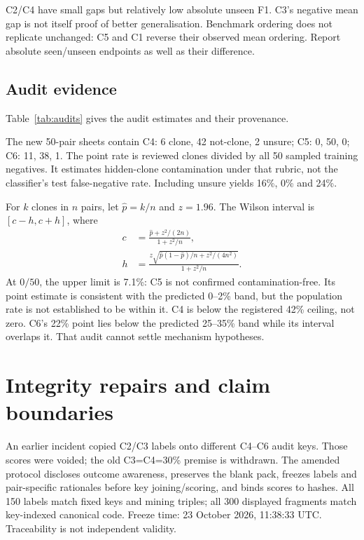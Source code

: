 \documentclass[conference]{IEEEtran}
\begin{document}
C2/C4 have small gaps but relatively low absolute unseen F1. C3's negative
mean gap is not itself proof of better generalisation. Benchmark ordering does
not replicate unchanged: C5 and C1 reverse their observed mean ordering.
Report absolute seen/unseen endpoints as well as their difference.

\subsection{Audit evidence}
Table~\ref{tab:audits} gives the audit estimates and their provenance.
\begin{table}[t]
\caption{All labels are agent/AI review, not independently human-validated.
C1 is an estimate, C2/C3 historical reviews, and C4--C6 use amendment
P4-AI-AUDIT-2026-10-23. Incl.\ unsure treats uncertain cases as clones.}
\label{tab:audits}
\centering\footnotesize
\setlength{\tabcolsep}{3pt}

\end{table}
The new 50-pair sheets contain C4: 6 clone, 42 not-clone, 2 unsure; C5: 0,
50, 0; C6: 11, 38, 1. The point rate is reviewed clones divided by all 50 sampled
training negatives. It estimates hidden-clone contamination under that rubric,
not the classifier's test false-negative rate. Including unsure yields
16\%, 0\% and 24\%.

For $k$ clones in $n$ pairs, let $\hat p=k/n$ and $z=1.96$.
The Wilson interval is $[c-h,c+h]$, where
\begin{equation}
\begin{aligned}
c &= \frac{\hat p+z^2/(2n)}{1+z^2/n},\\
h &= \frac{z\sqrt{\hat p(1-\hat p)/n+z^2/(4n^2)}}{1+z^2/n}.
\end{aligned}
\label{eq:wilson}
\end{equation}
At $0/50$, the upper limit is 7.1\%: C5 is not confirmed contamination-free.
Its point estimate is consistent with the predicted 0--2\% band, but the
population rate is not established to be within it. C4 is below the registered
42\% ceiling, not zero. C6's 22\% point lies below the predicted 25--35\% band
while its interval overlaps it. That audit cannot settle mechanism hypotheses.

\section{Integrity repairs and claim boundaries}
An earlier incident copied C2/C3 labels onto different C4--C6 audit keys.
Those scores were voided; the old C3=C4=30\% premise is withdrawn.
The amended protocol discloses outcome awareness, preserves the blank pack,
freezes labels and pair-specific rationales before key joining/scoring, and
binds scores to hashes. All 150 labels match fixed keys and mining triples;
all 300 displayed fragments match key-indexed canonical code. Freeze time:
23 October 2026, 11:38:33 UTC. Traceability is not independent validity.
\end{document}
